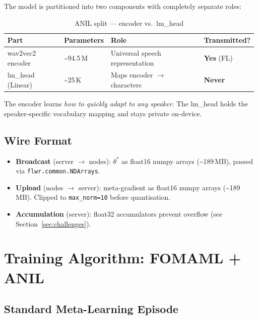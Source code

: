 \documentclass[11pt,a4paper]{article}
\theoremstyle{definition}
\begin{document}
The model is partitioned into two components with completely separate roles:

\begin{table}[H]
\centering
\caption{ANIL split --- encoder vs.\ lm\_head}
\label{tab:anil_split}
\begin{tabular}{llll}
\toprule
\textbf{Part} & \textbf{Parameters} & \textbf{Role} & \textbf{Transmitted?}\\
\midrule
wav2vec2 encoder & \textasciitilde94.5\,M & Universal speech representation & \textbf{Yes} (FL)\\
lm\_head (Linear) & \textasciitilde25\,K & Maps encoder $\to$ characters & \textbf{Never}\\
\bottomrule
\end{tabular}
\end{table}

The encoder learns \emph{how to quickly adapt to any speaker}.  The lm\_head
holds the speaker-specific vocabulary mapping and stays private on-device.

\subsection{Wire Format}

\begin{itemize}[leftmargin=*]
  \item \textbf{Broadcast} (server $\to$ nodes): $\theta^*$ as float16 numpy
        arrays (\textasciitilde189\,MB), passed via \texttt{flwr.common.NDArrays}.
  \item \textbf{Upload} (nodes $\to$ server): meta-gradient as float16 numpy
        arrays (\textasciitilde189\,MB).  Clipped to \texttt{max\_norm=10} before
        quantisation.
  \item \textbf{Accumulation} (server): float32 accumulators prevent overflow
        (see Section~\ref{sec:challenges}).
\end{itemize}

\section{Training Algorithm: FOMAML + ANIL}

\label{sec:algorithm}

\subsection{Standard Meta-Learning Episode}
\end{document}
